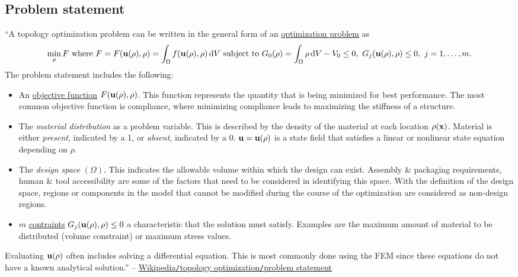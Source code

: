 \documentclass[oneside]{book}
\numberwithin{equation}{section}
\begin{document}
\subsection{Problem statement}
``A topology optimization problem can be written in the general form of an \href{https://en.wikipedia.org/wiki/Optimization_problem}{optimization problem} as
\begin{align*}
	\min_\rho F\mbox{ where } F = F({\bf u}(\rho),\rho) = \int_\Omega f({\bf u}(\rho),\rho)\,{\rm d}V\mbox{ subject to } G_0(\rho) = \int_\Omega \rho\,{\rm d}V - V_0\le 0,\ G_j({\bf u}(\rho),\rho)\le 0,\ j = 1,\ldots,m.
\end{align*}
The problem statement includes the following:
\begin{itemize}
	\item An \href{https://en.wikipedia.org/wiki/Objective_function}{objective function} $F({\bf u}(\rho),\rho)$. This function represents the quantity that is being minimized for best performance. The most common objective function is compliance, where minimizing compliance leads to maximizing the stiffness of a structure.
	\item The \textit{material distribution} as a problem variable. This is described by the density of the material at each location $\rho({\bf x})$. Material is either \textit{present}, indicated by a 1, or \textit{absent}, indicated by a 0. ${\bf u} = {\bf u}(\rho)$ is a state field that satisfies a linear or nonlinear state equation depending on $\rho$.
	\item The \textit{design space} $(\Omega)$. This indicates the allowable volume within which the design can exist. Assembly \& packaging requirements, human \& tool accessibility are some of the factors that need to be considered in identifying this space. With the definition of the design space, regions or components in the model that cannot be modified during the course of the optimization are considered as non-design regions.
	\item $m$ \href{https://en.wikipedia.org/wiki/Constraint_(mathematics)}{contraints} $G_j({\bf u}(\rho),\rho)\le 0$ a characteristic that the solution must satisfy. Examples are the maximum amount of material to be distributed (volume constraint) or maximum stress values.
\end{itemize}
Evaluating ${\bf u}(\rho)$ often includes solving a differential equation. This is most commonly done using the FEM since these equations do not have a known analytical solution.'' -- \href{https://en.wikipedia.org/wiki/Topology_optimization#Problem_statement}{Wikipedia\texttt{/}topology optimization\texttt{/}problem statement}
\end{document}
